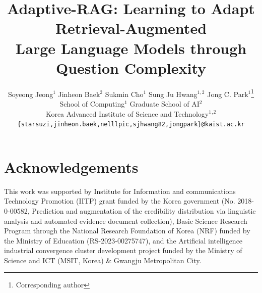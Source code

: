 \documentclass[11pt]{article}
\title{Adaptive-RAG: Learning to Adapt Retrieval-Augmented \\ Large Language Models through Question Complexity}
\author{Soyeong Jeong$^1$
        \quad Jinheon Baek$^2$
        \quad Sukmin Cho$^1$
        \quad Sung Ju Hwang$^{1, 2}$
        \quad Jong C. Park$^1$\thanks{\hspace{0.2cm}Corresponding author} \\
        School of Computing$^1$ \quad Graduate School of AI$^2$ \\
        Korea Advanced Institute of Science and Technology$^1$$^,$$^2$\\
       \texttt{\{starsuzi,jinheon.baek,nelllpic,sjhwang82,jongpark\}@kaist.ac.kr}}
\begin{document}
\maketitle












\section*{Acknowledgements}
This work was supported by Institute for Information and communications Technology Promotion (IITP) grant funded by the Korea government (No. 2018-0-00582, Prediction and augmentation of the credibility distribution via linguistic analysis and automated evidence document collection), Basic Science Research Program through the National Research Foundation of Korea (NRF) funded by the Ministry of Education (RS-2023-00275747), and the Artificial intelligence industrial convergence cluster development project funded by the Ministry of Science and ICT (MSIT, Korea) \& Gwangju Metropolitan City.






\end{document}

